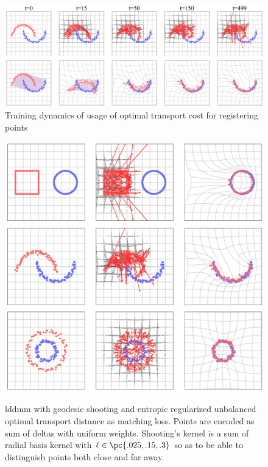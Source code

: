 \documentclass[11pt]{article}
\begin{document}
\begin{center} 
\begin{figure}[h!]
    \includegraphics[width=\textwidth]{assets/plt_lddmm_points_moons_training}
    \caption{Training dynamics of usage of optimal transport cost for registering points}
    \label{fig:plt_lddmm_points_training}
\end{figure}
\end{center} 


 
\begin{center} 
\begin{figure}[h!]
    \includegraphics[width=\textwidth]{assets/plt_lddmm_points_shapes} 
    \includegraphics[width=\textwidth]{assets/plt_lddmm_points_moons} 
    \includegraphics[width=\textwidth]{assets/plt_lddmm_points_circles} 
    \caption{lddmm with geodesic shooting and entropic regularized unbalanced optimal transport distance as matching loss. Points are encoded as sum of deltas with uniform weights. Shooting's kernel is a sum of radial basis kernel with $\ell \in \pc{.025,.15,.3}$ so as to be able to distinguish points both close and far away. }
    \label{fig:plt_lddmm_points}
\end{figure}
\end{center} 
    
  



\newpage
\printbibliography 
\end{document}
